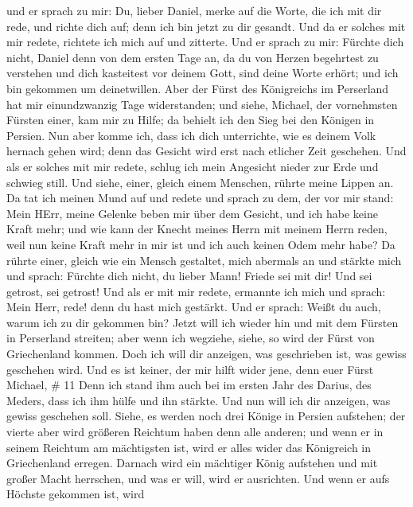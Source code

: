  und er sprach zu mir: Du, lieber Daniel, merke auf die
Worte, die ich mit dir rede, und richte dich auf; denn ich bin jetzt zu
dir gesandt. Und da er solches mit mir redete, richtete ich mich auf und
zitterte.  Und er sprach zu mir: Fürchte dich nicht, Daniel
denn von dem ersten Tage an, da du von Herzen begehrtest zu verstehen
und dich kasteitest vor deinem Gott, sind deine Worte erhört; und ich
bin gekommen um deinetwillen.  Aber der Fürst des
Königreichs im Perserland hat mir einundzwanzig Tage widerstanden; und
siehe, Michael, der vornehmsten Fürsten einer, kam mir zu Hilfe; da
behielt ich den Sieg bei den Königen in Persien.  Nun aber
komme ich, dass ich dich unterrichte, wie es deinem Volk hernach gehen
wird; denn das Gesicht wird erst nach etlicher Zeit geschehen.
 Und als er solches mit mir redete, schlug ich mein
Angesicht nieder zur Erde und schwieg still.  Und siehe,
einer, gleich einem Menschen, rührte meine Lippen an. Da tat ich meinen
Mund auf und redete und sprach zu dem, der vor mir stand: Mein HErr,
meine Gelenke beben mir über dem Gesicht, und ich habe keine Kraft mehr;
 und wie kann der Knecht meines Herrn mit meinem Herrn
reden, weil nun keine Kraft mehr in mir ist und ich auch keinen Odem
mehr habe?  Da rührte einer, gleich wie ein Mensch
gestaltet, mich abermals an und stärkte mich  und sprach:
Fürchte dich nicht, du lieber Mann! Friede sei mit dir! Und sei getrost,
sei getrost! Und als er mit mir redete, ermannte ich mich und sprach:
Mein Herr, rede! denn du hast mich gestärkt.  Und er
sprach: Weißt du auch, warum ich zu dir gekommen bin? Jetzt will ich
wieder hin und mit dem Fürsten in Perserland streiten; aber wenn ich
wegziehe, siehe, so wird der Fürst von Griechenland kommen.
 Doch ich will dir anzeigen, was geschrieben ist, was
gewiss geschehen wird. Und es ist keiner, der mir hilft wider jene, denn
euer Fürst Michael, \# 11  Denn ich stand ihm auch bei im
ersten Jahr des Darius, des Meders, dass ich ihm hülfe und ihn stärkte.
 Und nun will ich dir anzeigen, was gewiss geschehen soll.
Siehe, es werden noch drei Könige in Persien aufstehen; der vierte aber
wird größeren Reichtum haben denn alle anderen; und wenn er in seinem
Reichtum am mächtigsten ist, wird er alles wider das Königreich in
Griechenland erregen.  Darnach wird ein mächtiger König
aufstehen und mit großer Macht herrschen, und was er will, wird er
ausrichten.  Und wenn er aufs Höchste gekommen ist, wird
